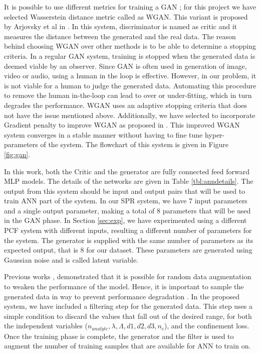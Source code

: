 \documentclass[10pt]{IEEEtran}
\begin{document}
It is possible to use different metrics for training a GAN \cite{goodfellow2014generative, mao2017least, lucic2018gans}; for this project we have selected Wasserstein distance metric called as WGAN. This variant is proposed by Arjovsky et al in \cite{arjovsky2017wasserstein}. In this system, discriminator is named as critic and it measures the distance between the generated  and the real data. The reason behind choosing WGAN over other methods is to be able to determine a stopping criteria. In a regular GAN system, training is stopped when the generated data is deemed viable by an observer. Since GAN is often used in generation of image, video or audio, using a human in the loop is effective. However, in our problem, it is not viable for a human to judge the generated data. Automating this procedure to remove the human in-the-loop can lead to over or under-fitting, which in turn degrades the performance. WGAN uses an adaptive stopping criteria that does not have the issue mentioned above. Additionally, we have selected to incorporate Gradient penalty to improve WGAN as proposed in \cite{gulrajani2017improved}. This improved WGAN system converges in a stable manner without having to fine tune hyper-parameters of the system. The flowchart of this system is given in Figure \ref{fig:gan}.

In this work, both the Critic and the generator are fully connected feed forward MLP models. The details of the networks are given in Table \ref{tbl:anndetails}. The output from this system should be input and output pairs that will be used to train ANN part of the system. In our SPR system, we have 7 input parameters and a single output parameter, making a total of 8 parameters that will be used in the GAN phase. In Section \ref{sec:exp}, we have experimented using a different PCF system with different inputs, resulting a different number of parameters for the system. The generator is supplied with the same number of parameters as its expected output, that is 8 for our dataset. These parameters are generated using Gaussian noise and is called latent variable. 

Previous works \cite{ravuri2019seeing, shmelkov2018good}, demonstrated that it is possible for random data augmentation to weaken the performance of the model. Hence, it is important to sample the generated data in way to prevent performance degradation \cite{bhattarai2019sampling}. In the proposed system, we have included a filtering step for the generated data. This step uses a simple condition to discard the values that fall out of the desired range, for both the independent variables ($n_{analyte}, \lambda, \Lambda, d1, d2, d3, n_c$), and the confinement loss. Once the training phase is complete, the generator and the filter is used to augment the number of training samples that are available for ANN to train on.
\end{document}
